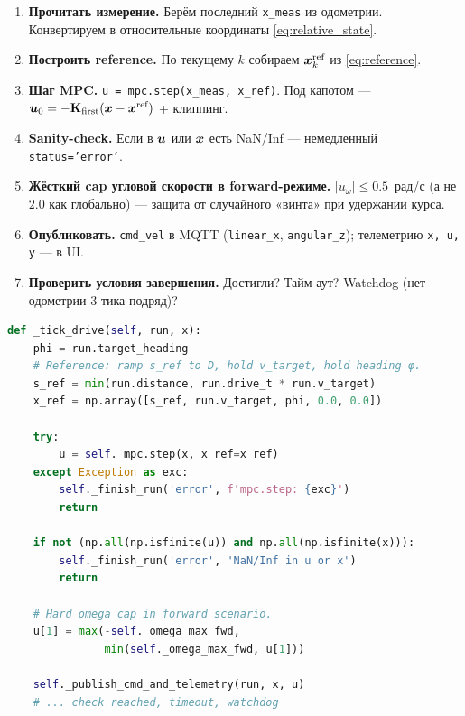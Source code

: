 \begin{enumerate}
  \item \textbf{Прочитать измерение.} Берём последний \texttt{x\_meas} из
        одометрии. Конвертируем в относительные координаты
        \eqref{eq:relative_state}.
  \item \textbf{Построить reference.} По текущему $k$ собираем
        $\bm{x}^\text{ref}_k$ из \eqref{eq:reference}.
  \item \textbf{Шаг MPC.} \texttt{u = mpc.step(x\_meas, x\_ref)}.
        Под капотом --- $\bm{u}_0 = -\mathbf{K}_\text{first}(\bm{x} -
        \bm{x}^\text{ref})$ + клиппинг.
  \item \textbf{Sanity-check.} Если в $\bm{u}$ или $\bm{x}$ есть
        NaN/Inf --- немедленный \texttt{status='error'}.
  \item \textbf{Жёсткий cap угловой скорости в forward-режиме.}
        $|u_\omega| \le 0.5$~рад/с (а не $2.0$ как глобально) --- защита
        от случайного «винта» при удержании курса.
  \item \textbf{Опубликовать.} \texttt{cmd\_vel} в MQTT
        (\texttt{linear\_x}, \texttt{angular\_z}); телеметрию \texttt{x, u, y}
        --- в UI.
  \item \textbf{Проверить условия завершения.}
        Достигли? Тайм-аут? Watchdog (нет одометрии 3 тика подряд)?
\end{enumerate}

\begin{codebox}[title={\filepath{pi\_nodes/nodes/mps\_node.py:436}}]
\begin{lstlisting}[language=Python]
def _tick_drive(self, run, x):
    phi = run.target_heading
    # Reference: ramp s_ref to D, hold v_target, hold heading φ.
    s_ref = min(run.distance, run.drive_t * run.v_target)
    x_ref = np.array([s_ref, run.v_target, phi, 0.0, 0.0])

    try:
        u = self._mpc.step(x, x_ref=x_ref)
    except Exception as exc:
        self._finish_run('error', f'mpc.step: {exc}')
        return

    if not (np.all(np.isfinite(u)) and np.all(np.isfinite(x))):
        self._finish_run('error', 'NaN/Inf in u or x')
        return

    # Hard omega cap in forward scenario.
    u[1] = max(-self._omega_max_fwd,
               min(self._omega_max_fwd, u[1]))

    self._publish_cmd_and_telemetry(run, x, u)
    # ... check reached, timeout, watchdog
\end{lstlisting}
\end{codebox}

